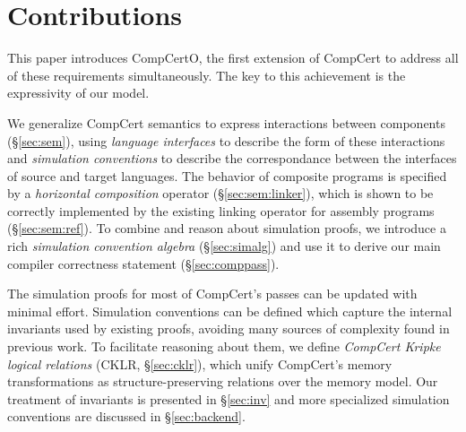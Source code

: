 \documentclass[draft,11pt]{report}
\begin{document}
\section{Contributions} %

This paper introduces CompCertO,
the first extension of CompCert to address
all of these requirements simultaneously.
The key to this achievement
is the expressivity of our model.

We generalize CompCert semantics
to express interactions between components (\S\ref{sec:sem}),
using \emph{language interfaces}
to describe the form of these interactions
and \emph{simulation conventions}
to describe the correspondance between the interfaces
of source and target languages.
The behavior of
composite programs is specified by a
\emph{horizontal composition} operator (\S\ref{sec:sem:linker}),
which is shown to be correctly implemented
by the existing linking operator for assembly programs
(\S\ref{sec:sem:ref}).
To combine and reason about simulation proofs,
we introduce a rich \emph{simulation convention algebra} (\S\ref{sec:simalg})
and use it to derive our main compiler correctness statement
(\S\ref{sec:comppass}).

The simulation proofs for
most of CompCert's passes
can be updated with minimal effort.
Simulation conventions can be defined
which capture the internal invariants
used by existing proofs,
avoiding many sources of complexity found
in previous work.
To facilitate reasoning about
them, %
we define \emph{CompCert Kripke logical relations}
(CKLR, \S\ref{sec:cklr}),
which unify
CompCert's memory transformations
as structure-preserving relations
over the memory model.
Our treatment of invariants is presented in \S\ref{sec:inv}
and more specialized simulation conventions
are discussed in \S\ref{sec:backend}.




\end{document}
